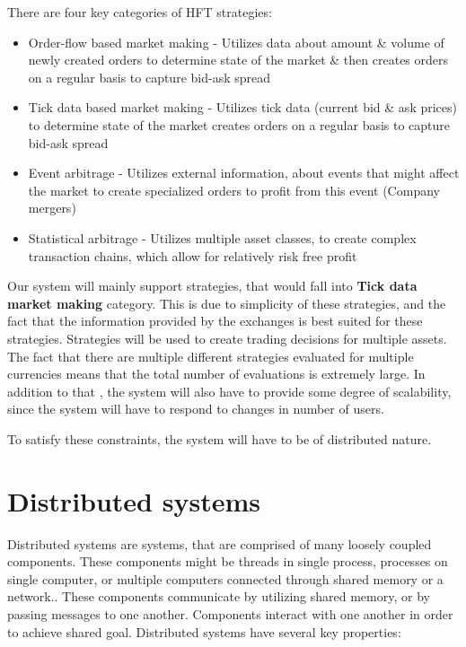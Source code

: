 There are four key categories of HFT strategies\cite{wiki:hft}:
\begin{itemize}
    \item {Order-flow based market making -
    Utilizes data about amount \& volume of newly created orders to determine state of the market \& then
    creates orders on a regular basis to capture bid-ask spread }
    \item {Tick data based market making - Utilizes tick data (current bid \& ask prices) to determine state of the market
    creates orders on a regular basis to capture bid-ask spread }
    \item {Event arbitrage - Utilizes external information, about events that might affect the market to
    create specialized orders to profit from this event (Company mergers)}
    \item {Statistical arbitrage - Utilizes multiple asset classes, to create complex transaction chains, which allow for relatively risk free profit }
\end{itemize}



Our system will mainly support strategies, that would fall into \textbf{Tick data market making} category. This is due
to simplicity of these strategies, and the fact that the information provided by the exchanges is best suited
for these strategies. Strategies will be used to create trading decisions for multiple assets. The fact that
there are multiple different strategies evaluated for multiple currencies means that the total number of evaluations is
extremely large. In addition to that , the system will also have to provide some degree of scalability, since the system will
have to respond to changes in number of users.

To satisfy these constraints, the system will have to be of distributed nature.

\section{Distributed systems}
Distributed systems are systems, that are comprised of many loosely coupled components. These components might be threads
in single process, processes on single computer, or multiple computers connected through shared memory or a network..
These components communicate by utilizing shared memory, or by passing messages to one another. Components interact with
one another in order to achieve shared goal. Distributed systems have several key properties\cite{Coulouris:2011:DSC:2029110}:

